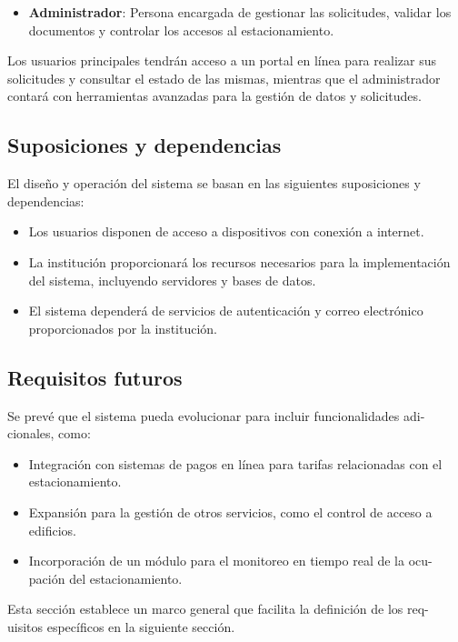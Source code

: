 {\begin{itemize}
\item {\textbf{Administrador}: Persona encargada de gestionar las solicitudes, validar los documentos y controlar los accesos al estacionamiento.}

	\end{itemize}
	Los usuarios principales tendrán acceso a un portal en línea para realizar sus
	solicitudes y consultar el estado de las mismas, mientras que el administrador
	contará con herramientas avanzadas para la gestión de datos y solicitudes.
	
	\subsection{Suposiciones y dependencias}
	El diseño y operación del sistema se basan en las siguientes suposiciones y dependencias:
\begin{itemize}
\item  Los usuarios disponen de acceso a dispositivos con conexión a internet.
\item  La institución proporcionará los recursos necesarios para la implementación
	del sistema, incluyendo servidores y bases de datos.
\item El sistema dependerá de servicios de autenticación y correo electrónico
	proporcionados por la institución.

\end{itemize}
\subsection{Requisitos futuros}
Se prevé que el sistema pueda evolucionar para incluir funcionalidades adi-
cionales, como:
\begin{itemize}

\item Integración con sistemas de pagos en línea para tarifas relacionadas con el
estacionamiento.
\item Expansión para la gestión de otros servicios, como el control de acceso a
edificios.
\item Incorporación de un módulo para el monitoreo en tiempo real de la ocu-
pación del estacionamiento.

\end{itemize}
Esta sección establece un marco general que facilita la definición de los req-
uisitos específicos en la siguiente sección.





}